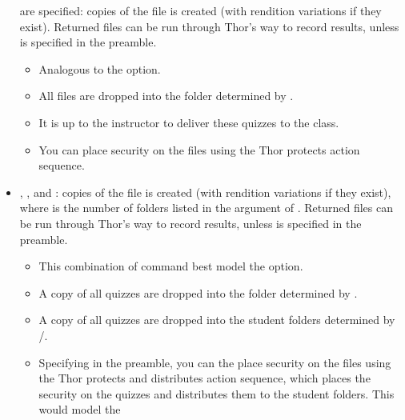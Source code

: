 \documentclass{article}
\begin{document}
\begin{itemize}
         are specified:  copies of the file
      is created (with rendition variations if they exist).  Returned files can be run
      through \textsf{Thor's way} to record results, unless 
      is specified in the preamble.
      \begin{itemize}
      \item Analogous to the  option.
      \item All files are dropped into the folder determined by
          .
      \item It is up to the instructor to deliver these quizzes to the
          class.
      \item You can place security on the files using the \textsf{Thor protects} action sequence.
      \end{itemize}

  \item {},
      , and
      :  copies of the file
      is created (with rendition variations if they exist), where
       is the number of folders listed in the argument of
      .  Returned files can be run through \textsf{Thor's
      way} to record results, unless  is specified in the
      preamble.
      \begin{itemize}
      \item This combination of command best model the  option.
      \item A copy of all quizzes are dropped into the folder determined by
          .
      \item A copy of all quizzes are dropped into the student folders determined by
          /.
      \item Specifying  in the preamble, you can
          the place security on the files using the \textsf{Thor protects
          and distributes} action sequence, which places the security on
          the quizzes and distributes them to the student folders. This
          would model the 
      \end{itemize}


\end{itemize}
\end{document}
